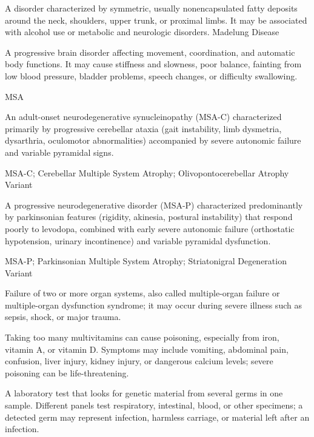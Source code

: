  A disorder characterized by symmetric, usually nonencapsulated fatty deposits around the neck, shoulders, upper trunk, or proximal limbs. It may be associated with alcohol use or metabolic and neurologic disorders.
\synonyms
Madelung Disease

 A progressive brain disorder affecting movement, coordination, and automatic body functions. It may cause stiffness and slowness, poor balance, fainting from low blood pressure, bladder problems, speech changes, or difficulty swallowing.

\synonyms
MSA

 An adult-onset neurodegenerative synucleinopathy (MSA-C) characterized primarily by progressive cerebellar ataxia (gait instability, limb dysmetria, dysarthria, oculomotor abnormalities) accompanied by severe autonomic failure and variable pyramidal signs.

\synonyms
MSA-C; Cerebellar Multiple System Atrophy; Olivopontocerebellar Atrophy Variant

 A progressive neurodegenerative disorder (MSA-P) characterized predominantly by parkinsonian features (rigidity, akinesia, postural instability) that respond poorly to levodopa, combined with early severe autonomic failure (orthostatic hypotension, urinary incontinence) and variable pyramidal dysfunction.

\synonyms
MSA-P; Parkinsonian Multiple System Atrophy; Striatonigral Degeneration Variant

 Failure of two or more organ systems, also called multiple-organ failure or multiple-organ dysfunction syndrome; it may occur during severe illness such as sepsis, shock, or major trauma.

 Taking too many multivitamins can cause poisoning, especially from iron, vitamin A, or vitamin D. Symptoms may include vomiting, abdominal pain, confusion, liver injury, kidney injury, or dangerous calcium levels; severe poisoning can be life-threatening.

 A laboratory test that looks for genetic material from several germs in one sample. Different panels test respiratory, intestinal, blood, or other specimens; a detected germ may represent infection, harmless carriage, or material left after an infection.

